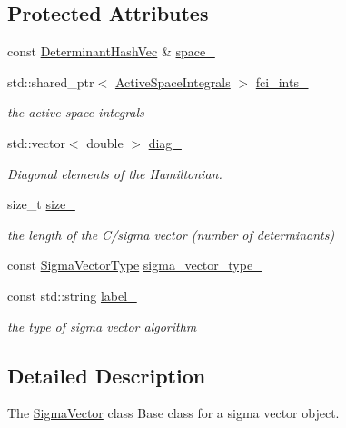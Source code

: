 \subsection*{Protected Attributes}
\begin{DoxyCompactItemize}
\item 
const \mbox{\hyperlink{classforte_1_1_determinant_hash_vec}{Determinant\+Hash\+Vec}} \& \mbox{\hyperlink{classforte_1_1_sigma_vector_ab7289d3fcf1eb43b62b8b64b86bbf6aa}{space\+\_\+}}
\item 
std\+::shared\+\_\+ptr$<$ \mbox{\hyperlink{classforte_1_1_active_space_integrals}{Active\+Space\+Integrals}} $>$ \mbox{\hyperlink{classforte_1_1_sigma_vector_a4e603b0f77c060ccf8b2abb907b7f29a}{fci\+\_\+ints\+\_\+}}
\begin{DoxyCompactList}\small\item\em the active space integrals \end{DoxyCompactList}\item 
std\+::vector$<$ double $>$ \mbox{\hyperlink{classforte_1_1_sigma_vector_a1a78e1fbd0384e26faa0771576a31f32}{diag\+\_\+}}
\begin{DoxyCompactList}\small\item\em Diagonal elements of the Hamiltonian. \end{DoxyCompactList}\item 
size\+\_\+t \mbox{\hyperlink{classforte_1_1_sigma_vector_a3d02c40d09db96f9779d3e8728704fae}{size\+\_\+}}
\begin{DoxyCompactList}\small\item\em the length of the C/sigma vector (number of determinants) \end{DoxyCompactList}\item 
const \mbox{\hyperlink{namespaceforte_a94410e08f0cf9a0cfc5e53c70b6bf485}{Sigma\+Vector\+Type}} \mbox{\hyperlink{classforte_1_1_sigma_vector_a8a9341a860bc6daca2e413a8cfce874d}{sigma\+\_\+vector\+\_\+type\+\_\+}}
\item 
const std\+::string \mbox{\hyperlink{classforte_1_1_sigma_vector_ad6ccddea1e2798891db9b90c0db17c79}{label\+\_\+}}
\begin{DoxyCompactList}\small\item\em the type of sigma vector algorithm \end{DoxyCompactList}\end{DoxyCompactItemize}


\subsection{Detailed Description}
The \mbox{\hyperlink{classforte_1_1_sigma_vector}{Sigma\+Vector}} class Base class for a sigma vector object. 

